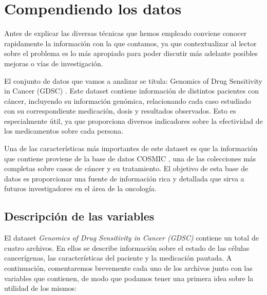 \chapter{Compendiendo los datos}\label{cap:analisis}

Antes de explicar las diversas técnicas que hemos empleado conviene conocer rapidamente la información con la que contamos, ya que contextualizar al lector sobre el problema es lo más apropiado para poder discutir más adelante posibles mejoras o vías de investigación. 

El conjunto de datos que vamos a analizar se titula: Genomics of Drug Sensitivity in Cancer (GDSC) \cite{gdsc_kaggle}. Este dataset contiene información de distintos pacientes con cáncer, incluyendo su información genómica, relacionando cada caso estudiado con su correspondiente medicación, dosis y resultados observados. Esto es especialmente útil, ya que proporciona diversos indicadores sobre la efectividad de los medicamentos sobre cada persona. 

Una  de las características más importantes de este dataset es que la información que contiene proviene de la base de datos COSMIC \cite{cosmic}, una de las colecciones más completas sobre casos de cáncer y su tratamiento. El objetivo de esta base de datos es proporcionar una fuente de información rica y detallada que sirva a futuros investigadores en el área de la oncología.

\section{Descripción de las variables}

El dataset \textit{Genomics of Drug Sensitivity in Cancer (GDSC)} contiene un total de cuatro archivos. En ellos se describe información sobre el estado de las células cancerígenas, las características del paciente y la medicación pautada. A continuación, comentaremos brevemente cada uno de los archivos junto con las variables que contienen, de modo que podamos tener una primera idea sobre la utilidad de los mismos:


